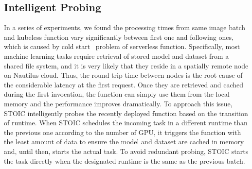  \subsection{Intelligent Probing}
 In a series of experiments, we found the processing times from same image batch and kubeless function vary significantly between first one and following ones, which is caused by cold start~\cite{ref:coldstart} problem of serverless function. Specifically, most machine learning tasks require retrieval of stored model and dataset from a shared file system, and it is very likely that they reside in a spatially remote node on Nautilus cloud. Thus, the round-trip time between nodes is the root cause of the considerable latency at the first request. Once they are retrieved and cached during the first invocation, the function can simply use them from the local memory and the performance improves dramatically. To approach this issue, STOIC intelligently probes the recently deployed function based on the transition of runtime. When STOIC schedules the incoming task in a different runtime than the previous one according to the number of GPU, it triggers the function with the least amount of data to ensure the model and dataset are cached in memory and, until then, starts the actual task. To avoid redundant probing, STOIC starts the task directly when the designated runtime is the same as the previous batch.